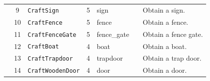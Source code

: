 \begin{table}[H]
{\begin{tabular}{@{}cclclcl@{}}
                      & 9   & \texttt{CraftSign}                & 5               & sign                    &                         & Obtain a sign.                  \\
                      & 10  & \texttt{CraftFence}               & 5               & fence                   &                         & Obtain a fence.                 \\
                      & 11  & \texttt{CraftFenceGate}           & 5               & fence\_gate             &                         & Obtain a fence gate.            \\
                      & 12  & \texttt{CraftBoat}                & 4               & boat                    &                         & Obtain a boat.                  \\
                      & 13  & \texttt{CraftTrapdoor}            & 4               & trapdoor                &                         & Obtain a trap door.             \\
                      & 14  & \texttt{CraftWoodenDoor}          & 4               & door                    &                         & Obtain a door.                   \\ \bottomrule
\end{tabular}}
\end{table}

